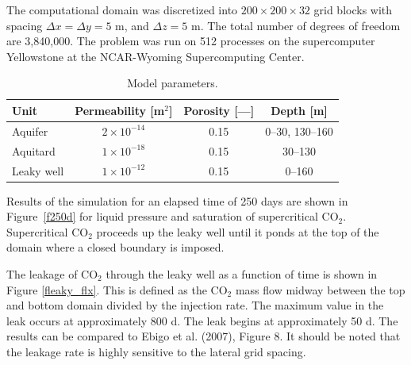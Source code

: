 The computational domain was discretized into $200 \!\times\! 200 \!\times\! 32$ grid blocks with spacing $\Delta x \!=\! \Delta y \!=\! 5$ m, and $\Delta z \!=\! 5$ m. The total number of degrees of freedom are 3,840,000. The problem was run on 512 processes on the supercomputer Yellowstone at the NCAR-Wyoming Supercomputing Center.

\begin{table}[h]\centering
\caption{Model parameters.}\label{tleaky_params}

\vspace{3mm}

\begin{tabular}{lccc}
\toprule
Unit & Permeability [m$^2$] & Porosity [---] & Depth [m]\\
\midrule
Aquifer  & $2 \times 10^{-14}$ & 0.15 & 0--30, 130--160  \\ 
Aquitard  & $1\times 10^{-18}$ & 0.15 & 30--130\\
Leaky well  & $1 \times 10^{-12}$ & 0.15 & 0--160\\
\bottomrule
\end{tabular}
\end{table}

Results of the simulation for an elapsed time of 250 days are shown in Figure~\ref{f250d} for liquid pressure and saturation of supercritical CO$_2$. Supercritical CO$_2$ proceeds up the leaky well until it ponds at the top of the domain where a closed boundary is imposed.

The leakage of CO$_2$ through the leaky well as a function of time is shown in Figure \ref{fleaky_flx}. This is defined as the CO$_2$ mass flow midway between the top and bottom domain divided by the injection rate. The maximum value in the leak  occurs at approximately 800 d. The leak begins at approximately 50 d. The results can be compared to Ebigo et al. (2007), Figure 8. It should be noted that the leakage rate is highly sensitive to the lateral grid spacing.


